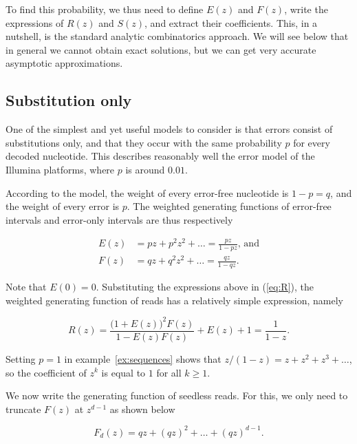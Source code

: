 \documentclass{article}
\begin{document}
To find this probability, we thus need to define $E(z)$ and $F(z)$, write
the expressions of $R(z)$ and $S(z)$, and extract their coefficients.
This, in a nutshell, is the standard analytic combinatorics approach. We
will see below that in general we cannot obtain exact solutions, but we
can get very accurate asymptotic approximations.

\subsection{Substitution only}

One of the simplest and yet useful models to consider is that errors
consist of substitutions only, and that they occur with the same
probability $p$ for every decoded nucleotide. This describes reasonably
well the error model of the Illumina platforms, where $p$ is around
$0.01$.

According to the model, the weight of every error-free nucleotide is $1-p
= q$, and the weight of every error is $p$. The weighted generating
functions of error-free intervals and error-only intervals are thus
respectively

\begin{equation*}
\begin{split}
E(z) &= pz + p^2z^2 + \ldots =
  \frac{pz}{1-pz}\text{, and} \\
F(z) &= qz + q^2z^2 + \ldots = \frac{qz}{1-qz}.
\end{split}
\end{equation*}

Note that $E(0) = 0$. Substituting the expressions above in (\ref{eq:R}),
the weighted generating function of reads has a relatively simple
expression, namely

\begin{equation}
\label{eq:Rp}
R(z) = \frac{\big(1+E(z)\big)^2F(z)}{1-E(z)F(z)} + E(z)+1= \frac{1}{1-z}.
\end{equation}

Setting $p=1$ in example~\ref{ex:sequences} shows that $z/(1-z) = z + z^2
+ z^3 + \ldots$, so the coefficient of $z^k$ is equal to $1$ for all $k
\geq 1$.

We now write the generating function of seedless reads. For this, we only
need to truncate $F(z)$ at $z^{d-1}$ as shown below

\begin{equation*}
F_d(z) = qz + (qz)^2 + \ldots + (qz)^{d-1}.
\end{equation*}
\end{document}

